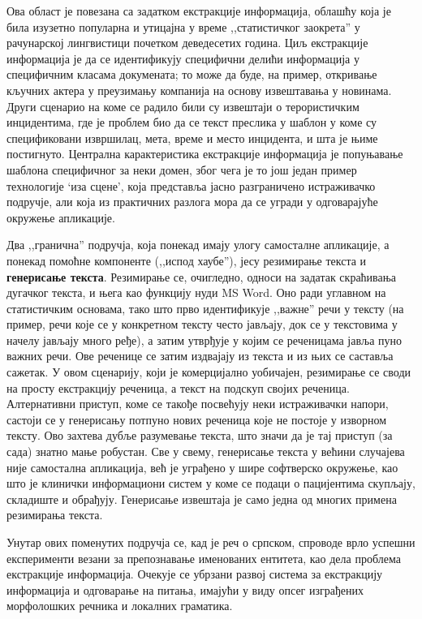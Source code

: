 {\begin{multicols}{2}

Ова област је повезана са задатком екстракције информација, облашћу која је била изузетно популарна и утицајна у време ,,статистичког заокрета'' у рачунарској лингвистици почетком деведесетих година. Циљ екстракције информација је да се идентификују специфични делићи информација у специфичним класама докумената; то може да буде, на пример, откривање кључних актера у преузимању компанија на основу извештавања у новинама. Други сценарио на коме се радило били су извештаји о терористичким инцидентима, где је проблем био да се текст преслика у шаблон у коме су спецификовани извршилац, мета, време и место инцидента, и шта је њиме постигнуто. Централна карактеристика екстракције информација је попуњавање шаблона специфичног за неки домен, због чега је то још један пример технологије ‘иза сцене’, која представља јасно разграничено истраживачко подручје, али која из практичних разлога мора да се угради у одговарајуће окружење апликације.  

Два ,,гранична'' подручја, која понекад имају улогу самосталне апликације, а понекад помоћне компоненте (,,испод хаубе''), јесу резимирање текста и \textbf{генерисање текста}. Резимирање се, очигледно, односи на задатак скраћивања дугачког текста, и њега као функцију нуди MS Word. Оно ради углавном на статистичким основама, тако што прво идентификује ,,важне'' речи у тексту (на пример, речи које се у конкретном тексту често јављају, док се у текстовима у начелу јављају много ређе), а затим утврђује у којим се реченицама јавља пуно важних речи. Ове реченице се затим издвајају из текста и из њих се саставља сажетак. У овом сценарију, који је комерцијално уобичајен, резимирање се своди на просту екстракцију реченица, а текст на подскуп својих реченица. Алтернативни приступ, коме се такође посвећују неки истраживачки напори, састоји се у генерисању потпуно нових реченица које не постоје у изворном тексту. Ово захтева дубље разумевање текста, што значи да је тај приступ (за сада) знатно мање робустан. Све у свему, генерисање текста у већини случајева није самостална апликација, већ је уграђено у шире софтверско окружење, као што је клинички информациони систем у коме се подаци о пацијентима скупљају, складиште и обрађују. Генерисање извештаја је само једна од многих примена резимирања текста. 

Унутар ових поменутих подручја се, кад је реч о српском, спроводе врло успешни експерименти везани за препознавање именованих ентитета, као дела проблема екстракције информација. Очекује се убрзани развој система за екстракцију информација и одговарање на питања, имајући у виду опсег изграђених морфолошких речника и локалних граматика. 


\end{multicols}}
